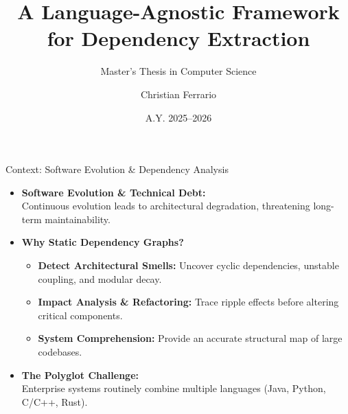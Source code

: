 \documentclass[aspectratio=169,10pt]{beamer}
\title[OmniDeps]{A Language-Agnostic Framework\\ for Dependency Extraction}
\subtitle{Master's Thesis in Computer Science}
\author[C. Ferrario]{Christian Ferrario}
\institute{University of Milano-Bicocca}
\date{A.Y. 2025--2026}
\begin{document}
\begin{frame}
  \titlepage
\end{frame}

\begin{frame}{Context: Software Evolution \& Dependency Analysis}
  \par\vspace{0.4em}
  
  \begin{itemize}\setlength{\itemsep}{0.65em}
    \item \textbf{Software Evolution \& Technical Debt:}\\
      {\small Continuous evolution leads to architectural degradation, threatening long-term maintainability.}
      
    \item \textbf{Why Static Dependency Graphs?}
      \begin{itemize}\setlength{\itemsep}{0.25em}
        \item \textbf{Detect Architectural Smells:} {\small Uncover cyclic dependencies, unstable coupling, and modular decay.}
        \item \textbf{Impact Analysis \& Refactoring:} {\small Trace ripple effects before altering critical components.}
        \item \textbf{System Comprehension:} {\small Provide an accurate structural map of large codebases.}
      \end{itemize}
      
    \item \textbf{The Polyglot Challenge:}\\
      {\small Enterprise systems routinely combine multiple languages (Java, Python, C/C++, Rust).}
  \end{itemize}

\end{frame}
\end{document}
